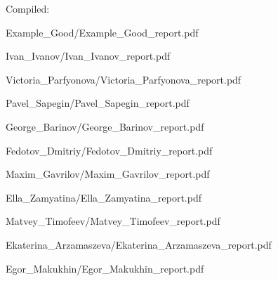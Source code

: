 \documentclass[a4paper]{article}
\begin{document}
Compiled: \DTMnow
\tableofcontents

\clearpage

{Example_Good/Example_Good_report.pdf}

{Ivan_Ivanov/Ivan_Ivanov_report.pdf}

{Victoria_Parfyonova/Victoria_Parfyonova_report.pdf}

{Pavel_Sapegin/Pavel_Sapegin_report.pdf}

{George_Barinov/George_Barinov_report.pdf}

{Fedotov_Dmitriy/Fedotov_Dmitriy_report.pdf}

{Maxim_Gavrilov/Maxim_Gavrilov_report.pdf}

{Ella_Zamyatina/Ella_Zamyatina_report.pdf}

{Matvey_Timofeev/Matvey_Timofeev_report.pdf}

{Ekaterina_Arzamaszeva/Ekaterina_Arzamaszeva_report.pdf}

{Egor_Makukhin/Egor_Makukhin_report.pdf}
\end{document}
